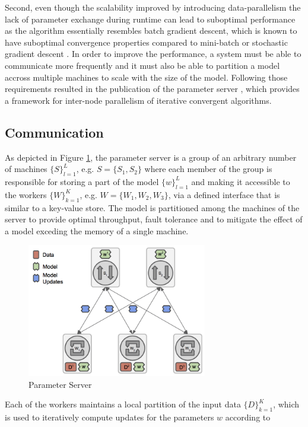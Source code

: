 Second, even though the scalability improved by introducing data-parallelism the lack of parameter exchange during runtime can lead to suboptimal performance \cite{xing2015strategies} as the algorithm essentially resembles batch gradient descent, which is known to have suboptimal convergence properties compared to mini-batch or stochastic gradient descent \cite{bottou2010large} \cite{smith2016cocoa}.
In order to improve the performance, a system must be able to communicate more frequently and it must also be able to partition a model accross multiple machines to scale with the size of the model.
Following those requirements resulted in the publication of the parameter server \cite{Li2014}, which provides a framework for inter-node parallelism of iterative convergent algorithms.

\subsection{Communication}
As depicted in Figure \ref{fig:param_server}, the parameter server is a group of an arbitrary number of machines $\{S\}_{l=1}^L$, e.g. $S = \{S_1, S_2\}$ where each member of the group is responsible for storing a part of the model $\{w\}_{l=1}^L$ and making it accessible to the workers $\{W\}_{k=1}^K$, e.g. $W = \{W_1, W_2, W_3\}$, via a defined interface that is similar to a key-value store.
The model is partitioned among the machines of the server to provide optimal throughput, fault tolerance and to mitigate the effect of a model exceding the memory of a single machine.
\begin{figure}[ht]
\centering
\includegraphics[width=0.7\textwidth]{img/param_server.png}
\caption{Parameter Server}
\label{fig:param_server}
\end{figure}
Each of the workers maintains a local partition of the input data $\{D\}_{k=1}^K$, which is used to iteratively compute updates for the parameters $w$ according to
